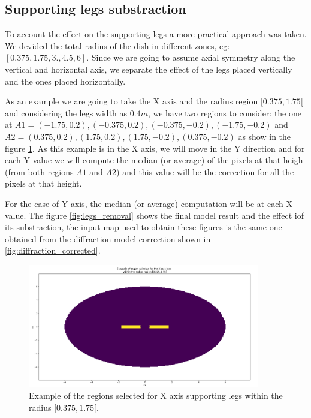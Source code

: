 \subsection{Supporting legs substraction}

To account the effect on the supporting legs a more practical approach was taken. We devided the total radius of the dish in different zones, eg: $[0.375, 1.75, 3.,4.5, 6]$. Since we are going to assume axial symmetry along the vertical and horizontal axis, we separate the effect of the legs placed vertically and the ones placed horizontally.

As an example we are going to take the X axis and the radius region $[0.375, 1.75[$ and considering the legs width as $0.4m$, we have two regions to consider: the one at $A1=(-1.75,0.2), (-0.375,0.2), (-0.375, -0.2), (-1.75,-0.2)$ and $A2=(0.375,0.2), (1.75, 0.2), (1.75, -0.2), (0.375,-0.2)$ as show in the figure \ref{fig:ex_legs_region}. As this example is in the X axis, we will move in the Y direction and for each Y value we will compute the median (or average) of the pixels at that heigh (from both regions $A1$ and $A2$) and this value will be the correction for all the pixels at that height.


For the case of Y axis, the median (or average) computation will be at each X value.
The figure \ref{fig:legs_removal} shows the final model result and the effect iof its substraction, the input map used to obtain these figures is the same one obtained from the diffraction model correction shown in \ref{fig:diffraction_corrected}.

\begin{figure}
    \centering
    \includegraphics[width=0.9\textwidth]{images/ex_legs_region.png}
    \caption{Example of the regions selected for X axis supporting legs within the radius $[0.375,1.75[$.}
    \label{fig:ex_legs_region}
\end{figure}


